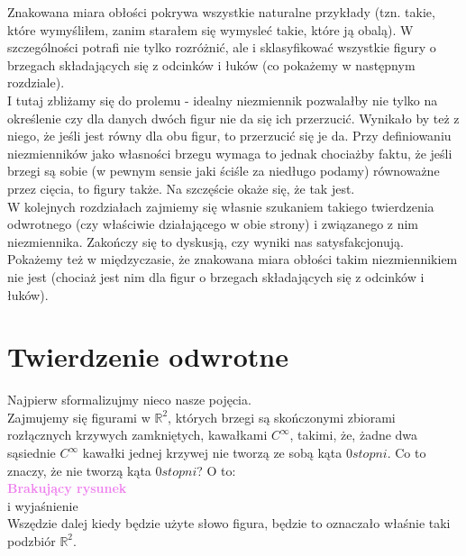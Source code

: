 \documentclass[a4paper, 12pt]{article}
\newcommand{\rysunek}[1]{\hfill \break\\[16pt] \Huge \textbf{\textcolor{violet}{Brakujący rysunek \normalsize
#1}} \hfill
\break \\[16pt] \normalsize}
\begin{document}
 Znakowana miara obłości pokrywa wszystkie naturalne przykłady (tzn. takie, które wymyśliłem, zanim starałem
 się wymysleć takie, które ją obalą). W szczególności potrafi nie tylko rozróżnić, ale i sklasyfikować
 wszystkie figury o brzegach składających się z odcinków i łuków (co pokażemy w następnym rozdziale). \\
 I tutaj zbliżamy się do prolemu - idealny niezmiennik pozwalałby nie tylko na określenie czy dla danych
 dwóch figur nie da się ich przerzucić. Wynikało by też z niego, że jeśli jest równy dla obu figur, to
 przerzucić się je da. Przy definiowaniu niezmienników jako własności brzegu wymaga to jednak chociażby
 faktu, że jeśli brzegi są sobie (w pewnym sensie jaki ściśle za niedługo podamy) równoważne przez cięcia,
 to figury także. Na szczęście okaże się, że tak jest. \\
 W kolejnych rozdziałach zajmiemy się własnie szukaniem takiego twierdzenia odwrotnego (czy właściwie
 działającego w obie strony) i związanego z nim niezmiennika. Zakończy się to dyskusją, czy wyniki nas
 satysfakcjonują. \\
 Pokażemy też w międzyczasie, że znakowana miara obłości takim niezmiennikiem nie jest (chociaż jest nim
 dla figur o brzegach składających się z odcinków i łuków).
\section{Twierdzenie odwrotne}
Najpierw sformalizujmy nieco nasze pojęcia. \\
Zajmujemy się figurami w $\mathbb{R}^2$, których brzegi są skończonymi zbiorami rozłącznych
krzywych
zamkniętych, kawałkami $C^\infty$, takimi, że, żadne dwa sąsiednie $C^\infty$ kawałki jednej krzywej nie
tworzą ze sobą kąta $0 stopni$. Co to znaczy, że nie tworzą kąta $0 stopni$? O to:
\rysunek{}
i wyjaśnienie \\

Wszędzie dalej kiedy będzie użyte słowo figura, będzie to oznaczało właśnie taki podzbiór $\mathbb{R}^2$. \\
\end{document}
